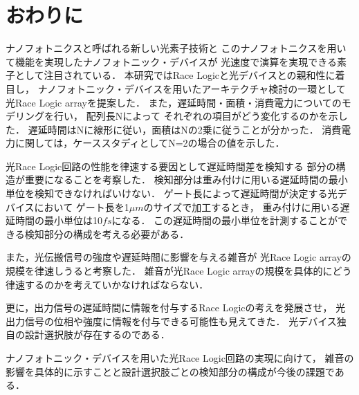 \chapter{おわりに}

ナノフォトニクスと呼ばれる新しい光素子技術と
このナノフォトニクスを用いて機能を実現したナノフォトニック・デバイスが
光速度で演算を実現できる素子として注目されている．
本研究ではRace Logicと光デバイスとの親和性に着目し，
ナノフォトニック・デバイスを用いたアーキテクチャ検討の一環として
光Race Logic arrayを提案した．
また，遅延時間・面積・消費電力についてのモデリングを行い，
配列長Nによって
それぞれの項目がどう変化するのかを示した．
遅延時間はNに線形に従い，面積はNの2乗に従うことが分かった．
消費電力に関しては，ケーススタディとしてN=2の場合の値を示した．

光Race Logic回路の性能を律速する要因として遅延時間差を検知する
部分の構造が重要になることを考察した．
検知部分は重み付けに用いる遅延時間の最小単位を検知できなければいけない．
ゲート長によって遅延時間が決定する光デバイスにおいて
ゲート長を1$\mu m$のサイズで加工するとき，
重み付けに用いる遅延時間の最小単位は10$fs$になる．
この遅延時間の最小単位を計測することができる検知部分の構成を考える必要がある．

また，光伝搬信号の強度や遅延時間に影響を与える雑音が
光Race Logic arrayの規模を律速しうると考察した．
雑音が光Race Logic arrayの規模を具体的にどう律速するのかを考えていかなければならない．

更に，出力信号の遅延時間に情報を付与するRace Logicの考えを発展させ，
光出力信号の位相や強度に情報を付与できる可能性も見えてきた．
光デバイス独自の設計選択肢が存在するのである．

ナノフォトニック・デバイスを用いた光Race Logic回路の実現に向けて，
雑音の影響を具体的に示すことと設計選択肢ごとの検知部分の構成が今後の課題である．


